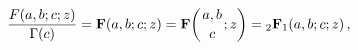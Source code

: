 \[\frac{\mathop{F\/}\nolimits\!\left(a,b;c;z\right)}{\mathop{\Gamma\/}\nolimits%
\!\left(c\right)}=\mathop{\mathbf{F}\/}\nolimits\!\left(a,b;c;z\right)=\mathop%
{\mathbf{F}\/}\nolimits\!\left({a,b\atop c};z\right)=\mathop{{{}_{2}{\mathbf{F%
}}_{1}}\/}\nolimits\!\left(a,b;c;z\right),\]